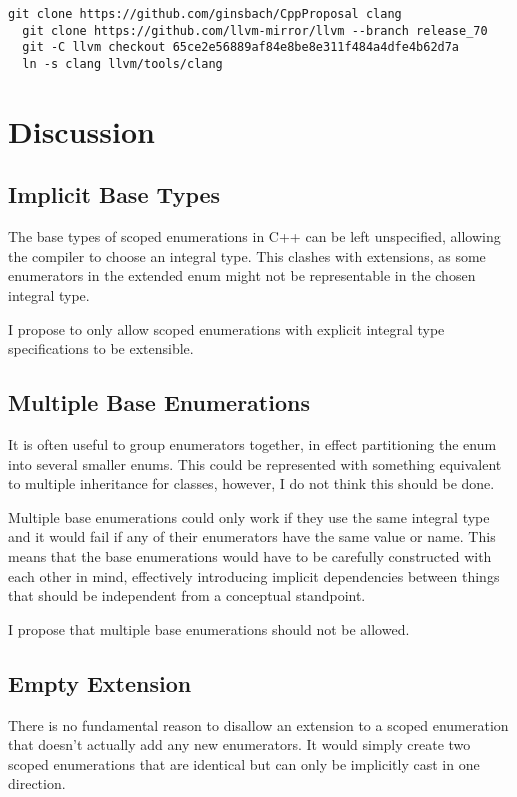 \documentclass{scrartcl}
\begin{document}
{\footnotesize
\begin{lstlisting}[language={}]
  git clone https://github.com/ginsbach/CppProposal clang
  git clone https://github.com/llvm-mirror/llvm --branch release_70
  git -C llvm checkout 65ce2e56889af84e8be8e311f484a4dfe4b62d7a
  ln -s clang llvm/tools/clang
\end{lstlisting}}

\section*{Discussion}
\subsection*{Implicit Base Types}
The base types of scoped enumerations in C++ can be left unspecified, allowing
the compiler to choose an integral type.
This clashes with extensions, as some enumerators in the extended enum might not
be representable in the chosen integral type.

I propose to only allow scoped enumerations with explicit integral type
specifications to be extensible.

\subsection*{Multiple Base Enumerations}
It is often useful to group enumerators together, in effect partitioning the
enum into several smaller enums.
This could be represented with something equivalent to multiple inheritance for
classes, however, I do not think this should be done.

Multiple base enumerations could only work if they use the same integral type
and it would fail if any of their enumerators have the same value or name.
This means that the base enumerations would have to be carefully constructed
with each other in mind, effectively introducing implicit dependencies between
things that should be independent from a conceptual standpoint.

I propose that multiple base enumerations should not be allowed.

\subsection*{Empty Extension}
There is no fundamental reason to disallow an extension to a scoped enumeration that doesn't actually add any new enumerators.
It would simply create two scoped enumerations that are identical but can only be implicitly cast in one direction.
\end{document}
